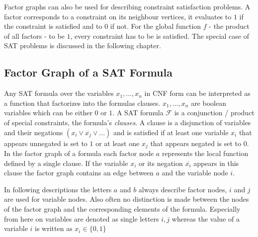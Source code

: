 \newpage
Factor graphs can also be used for describing constraint satisfaction problems. A factor corresponds to a constraint on its neighbour vertices, it evaluates to $1$ if the constraint is satisfied and to $0$ if not. For the global function $f$ - the product of all factors - to be $1$, every constraint has to be is satisfied. The special case of SAT problems is discussed in the following chapter.



\subsection{Factor Graph of a SAT Formula}
Any SAT formula over the variables $x_1, \ldots, x_n$ in CNF form can be interpreted as a function that factorizes into the formulas clauses. \newline
$x_1, \ldots, x_n$ are boolean variables which can be either $0$ or $1$. A SAT formula $\mathcal{F}$ is a conjunction / product of special constraints, the formula's \emph{clauses}. A clause is a disjunction of variables and their negations  $(x_i\lor \overline{x_j} \lor \ldots)$ and is satisfied if at least one variable $x_i$ that appears unnegated is set to $1$ or at least one $x_j$ that appears negated is set to $0$. \newline
In the factor graph of a formula each factor node $a$ represents the local function defined by a single clause. If the variable $x_i$ or its negation $\overline{x_i}$ appears in this clause the factor graph contains an edge between $a$ and the variable node $i$. 

In following descriptions the letters $a$ and $b$ always describe factor nodes, $i$ and $j$ are used for variable nodes. Also often no distinction is made between the nodes of the factor graph and the corresponding elements of the formula. Especially from here on variables are denoted as single letters $i, j$ whereas the value of a variable $i$ is written as $x_i \in \{0, 1\}$

